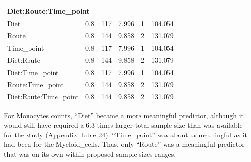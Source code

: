 \documentclass[
  12pt,
  letterpaper,
]{article}
\begin{document}
\begin{longtable}{l|rrrrr}
\multicolumn{6}{l}{Diet:Route:Time\_point} \\[2.5pt] 
\midrule\addlinespace[2.5pt]
Diet & 0.8 & 117 & 7.996 & 1 & 104.054 \\ 
Route & 0.8 & 144 & 9.858 & 2 & 131.079 \\ 
Time\_point & 0.8 & 117 & 7.996 & 1 & 104.054 \\ 
Diet:Route & 0.8 & 144 & 9.858 & 2 & 131.079 \\ 
Diet:Time\_point & 0.8 & 117 & 7.996 & 1 & 104.054 \\ 
Route:Time\_point & 0.8 & 144 & 9.858 & 2 & 131.079 \\ 
Diet:Route:Time\_point & 0.8 & 144 & 9.858 & 2 & 131.079 \\ 
\bottomrule
\end{longtable}
\endgroup

For Monocytes counts, ``Diet'' became a more meaningful predictor, although it would still have required a 6.3 times larger total sample size than was available for the study (Appendix Table 24). ``Time\_point'' was about as meaningful as it had been for the Myeloid\_cells. Thus, only ``Route'' was a meaningful predictor that was on its own within proposed sample sizes ranges.
\end{document}
